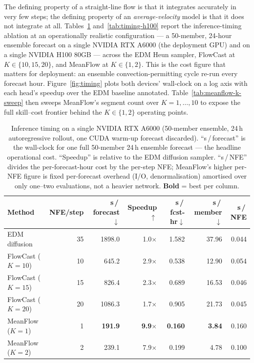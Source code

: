 The defining property of a straight-line flow is that it integrates accurately in very few steps; the defining property of an \emph{average-velocity} model is that it does not integrate at all. Tables~\ref{tab:timing} and~\ref{tab:timing-h100} report the inference-timing ablation at an operationally realistic configuration --- a 50-member, 24-hour ensemble forecast on a single NVIDIA RTX A6000 (the deployment GPU) and on a single NVIDIA H100 80GB --- across the EDM Heun sampler, FlowCast at $K \in \{10, 15, 20\}$, and MeanFlow at $K \in \{1, 2\}$. This is the cost figure that matters for deployment: an ensemble convection-permitting cycle re-run every forecast hour. Figure~\ref{fig:timing} plots both devices' wall-clock on a log axis with each head's speedup over the EDM baseline annotated. Table~\ref{tab:meanflow-k-sweep} then sweeps MeanFlow's segment count over $K = 1, \dots, 10$ to expose the full skill--cost frontier behind the $K \in \{1, 2\}$ operating points.

\begin{table}[htbp]
  \centering
  \caption[Inference timing ablation (A6000)]{Inference timing on a single NVIDIA RTX A6000 (50-member ensemble, 24\,h autoregressive rollout, one CUDA warm-up forecast discarded). ``s\,/\,forecast'' is the wall-clock for one full 50-member 24\,h ensemble forecast --- the headline operational cost. ``Speedup'' is relative to the EDM diffusion sampler. ``s\,/\,NFE'' divides the per-forecast-hour cost by the per-step NFE; MeanFlow's higher per-NFE figure is fixed per-forecast overhead (I/O, denormalisation) amortised over only one--two evaluations, not a heavier network. \textbf{Bold} = best per column.}
  \label{tab:timing}
  \small
  \setlength{\tabcolsep}{6pt}
  \begin{tabular}{lrrrrrr}
    \toprule
    Method & NFE/step & s\,/\,forecast$\downarrow$ & Speedup$\uparrow$ & s\,/\,fcst-hr$\downarrow$ & s\,/\,member$\downarrow$ & s\,/\,NFE \\
    \midrule
    EDM diffusion        & 35 & 1898.0 & 1.0$\times$ & 1.582 & 37.96 & 0.044 \\
    FlowCast ($K{=}10$)  & 10 & 645.2  & 2.9$\times$ & 0.538 & 12.90 & 0.054 \\
    FlowCast ($K{=}15$)  & 15 & 826.4  & 2.3$\times$ & 0.689 & 16.53 & 0.046 \\
    FlowCast ($K{=}20$)  & 20 & 1086.3 & 1.7$\times$ & 0.905 & 21.73 & 0.045 \\
    MeanFlow ($K{=}1$)   & 1  & \textbf{191.9} & \textbf{9.9$\times$} & \textbf{0.160} & \textbf{3.84} & 0.160 \\
    MeanFlow ($K{=}2$)   & 2  & 239.1  & 7.9$\times$ & 0.199 & 4.78  & 0.100 \\
    \bottomrule
  \end{tabular}
\end{table}

